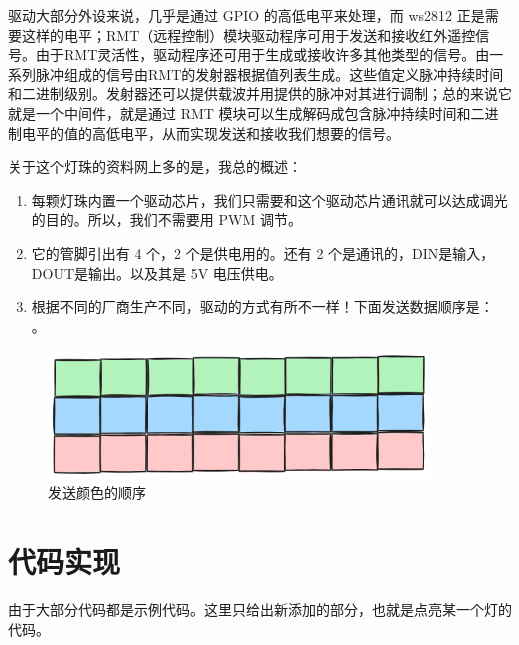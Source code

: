 \documentclass[lang=cn,newtx,10pt,scheme=chinese]{elegantbook}
\begin{document}
驱动大部分外设来说，几乎是通过 GPIO 的高低电平来处理，而 ws2812 正是需要这样的电平；RMT（远程控制）模块驱动程序可用于发送和接收红外遥控信号。由于RMT灵活性，驱动程序还可用于生成或接收许多其他类型的信号。由一系列脉冲组成的信号由RMT的发射器根据值列表生成。这些值定义脉冲持续时间和二进制级别。发射器还可以提供载波并用提供的脉冲对其进行调制；总的来说它就是一个中间件，就是通过 RMT 模块可以生成解码成包含脉冲持续时间和二进制电平的值的高低电平，从而实现发送和接收我们想要的信号。

关于这个灯珠的资料网上多的是，我总的概述：

\begin{enumerate}
\item 每颗灯珠内置一个驱动芯片，我们只需要和这个驱动芯片通讯就可以达成调光的目的。所以，我们不需要用 PWM 调节。
\item 它的管脚引出有 4 个，2 个是供电用的。还有 2 个是通讯的，DIN是输入，DOUT是输出。以及其是 5V 电压供电。
\item 根据不同的厂商生产不同，驱动的方式有所不一样！下面发送数据顺序是： 。
\end{enumerate}

\begin{figure}[!htb]
\centering
\includegraphics[width=0.9\textwidth]{rmt-rgb.png}
\caption{发送颜色的顺序}
\end{figure}

\section{代码实现}

由于大部分代码都是示例代码。这里只给出新添加的部分，也就是点亮某一个灯的代码。
\end{document}

